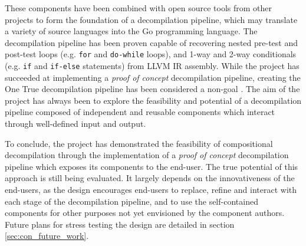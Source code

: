 These components have been combined with open source tools from other projects to form the foundation of a decompilation pipeline, which may translate a variety of source languages into the Go programming language. The decompilation pipeline has been proven capable of recovering nested pre-test and post-test loops (e.g. \texttt{for} and \texttt{do-while} loops), and 1-way and 2-way conditionals (e.g. \texttt{if} and \texttt{if-else} statements) from LLVM IR assembly. While the project has succeeded at implementing a \textit{proof of concept} decompilation pipeline, creating the One True decompilation pipeline has been considered a non-goal \cite{non-goals}. The aim of the project has always been to explore the feasibility and potential of a decompilation pipeline composed of independent and reusable components which interact through well-defined input and output.

To conclude, the project has demonstrated the feasibility of compositional decompilation through the implementation of a \textit{proof of concept} decompilation pipeline which exposes its components to the end-user. The true potential of this approach is still being evaluated. It largely depends on the innovativeness of the end-users, as the design encourages end-users to replace, refine and interact with each stage of the decompilation pipeline, and to use the self-contained components for other purposes not yet envisioned by the component authors. Future plans for stress testing the design are detailed in section \ref{sec:con_future_work}.
